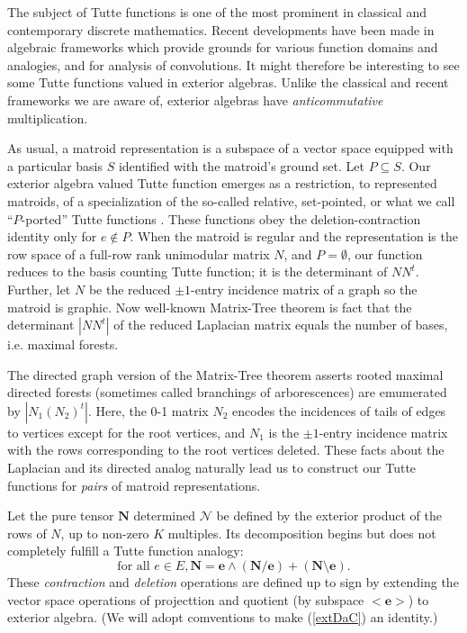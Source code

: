 \documentclass[Unicode]{cedram-alco}
\begin{document}
The subject of Tutte functions is one of the most prominent
in classical and contemporary discrete mathematics. Recent
developments have been made in algebraic frameworks which provide
grounds for various function domains and analogies,
and for analysis of convolutions.
It might therefore be interesting to see some Tutte functions valued
in exterior algebras.  Unlike the classical and recent frameworks
we are aware of, 
exterior algebras \cite{MarcusFDMuAlPt2} have \emph{anticommutative} multiplication.

As usual, a matroid representation is a subspace
of a vector space equipped with a particular basis $S$
identified with the matroid's ground set.  Let $P \subseteq S$.
Our exterior
algebra valued Tutte function emerges as a restriction, to represented matroids,
of a specialization of
the so-called relative, set-pointed, or what we call ``$P$-ported''
Tutte functions \cite{MR0419272,SetPointedLV,sdcPorted,TutteEx,RelTuttePolyDiaoHetyei}.
These functions obey the deletion-contraction
identity only for $e\not\in P$.  When the matroid is regular and
the representation is the row space of a full-row rank unimodular matrix $N$, and $P=\emptyset$,
our function reduces to the basis counting Tutte function; it is the determinant
of $N N^t$.
Further, let $N$ be the reduced $\pm 1$-entry incidence matrix of a graph so the
matroid is graphic.  Now well-known Matrix-Tree theorem
is fact that the determinant $|N N^t|$ of the
reduced Laplacian matrix equals the number of bases, i.e. maximal forests.

The directed graph version of the Matrix-Tree theorem asserts rooted maximal directed forests
(sometimes called branchings of arborescences) are emumerated by 
$|N_1 (N_2)^t|$.  Here, the 0-1 matrix $N_2$ encodes the incidences of tails of edges to
vertices except for the root vertices, and $N_1$ is the $\pm 1$-entry incidence matrix with
the rows corresponding to the root vertices deleted.  These facts about the Laplacian and
its directed analog naturally lead us to construct our
Tutte functions for \emph{pairs} of matroid representations.  

Let the pure tensor $\mathbf{N}$
determined $\mathcal{N}$ be defined
by the exterior product 
of the rows of $N$, up to non-zero $K$ multiples.  Its 
decomposition begins but does not completely fulfill a Tutte function analogy:
\begin{equation}\label{extDaC}
  \text{for all } e \in E, \mathbf{N} =
  \mathbf{e}\wedge(\mathbf{N}/\mathbf{e}) +
  (\mathbf{N}\setminus \mathbf{e}).
\end{equation}
These \emph{contraction} and \emph{deletion} operations are defined up to sign
by extending the vector space operations of projecttion and quotient
(by subspace $<\mathbf{e}>$) to exterior algebra.  (We will adopt comventions
to make (\ref{extDaC}) an identity.)




\end{document}
